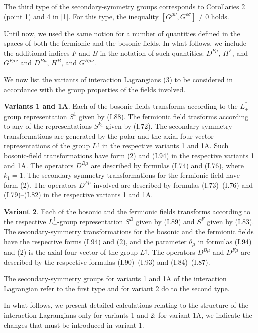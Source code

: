 \documentclass[a4paper,12pt]{article}
\begin{document}
The third type of the secondary-symmetry groups corresponds to Corollaries 2
(point 1) and 4 in [1]. For this type, the inequality 
$[G^{\mu\nu}, G^{\rho\sigma}] \neq 0$ holds.

Until now, we used the same notion for a number of quantities defined in the
spaces of both the fermionic and the bosonic fields. In what follows, we
include the additional indices $F$ and $B$ in the notation of such quantities:
$D^{F\mu}$, $H^{F}$, and $G^{F\mu\nu}$ and $D^{B\mu}$, $H^{B}$, and 
$G^{B\mu\nu}$. 

We now list the variants of interaction Lagrangians (3) to be considered in
accordance with the group properties of the fields involved.

{\bf Variants 1 and 1A}. Each of the bosonic fields transforms according to the
$L^{\uparrow}_{+}$-group representation $S^{1}$ given by (I.88). The fermionic
field trasforms according to any of the representations $S^{k_{1}}$ given by 
(I.72). The secondary-symmetry transformations are generated by the polar and 
the axial four-vector representations of the group $L^{\uparrow}$ in the 
respective variants 1 and 1A. Such bosonic-field transformations have form (2) 
and (I.94) in the respective variants 1 and 1A. The operators $D^{B\mu}$ are 
described by formulas (I.74) and (I.76), where $k_{1}=1$. The 
secondary-symmetry transformations for the fermionic field have form (2). The 
operators $D^{F\mu}$ involved are described by formulas (I.73)--(I.76) and 
(I.79)--(I.82) in the respective variants 1 and 1A.

{\bf Variant 2}. Each of the bosonic and the fermionic fields transforms 
according to the respective $L^{\uparrow}_{+}$-group representation
$S^{B}$ given by (I.89) and $S^{F}$ given by (I.83). The secondary-symmetry 
transformations for the bosonic and the fermionic fields have the respective
forms (I.94) and (2), and the parameter $\theta_{\mu}$ in formulas (I.94) and
(2) is the axial four-vector of the group $L^{\uparrow}$. The operators
$D^{B\mu}$ and $D^{F\mu}$ are described by the respective formulas
(I.90)--(I.93) and (I.84)--(I.87).

The secondary-symmetry groups for variants 1 and 1A of the interaction
Lagrangian refer to the first type and for variant 2 do to the second type.

In what follows, we present detailed calculations relating to the structure of
the interaction Lagrangians only for variants 1 and 2; for variant 1A, we
indicate the changes that must be introduced in variant 1.
\end{document}
